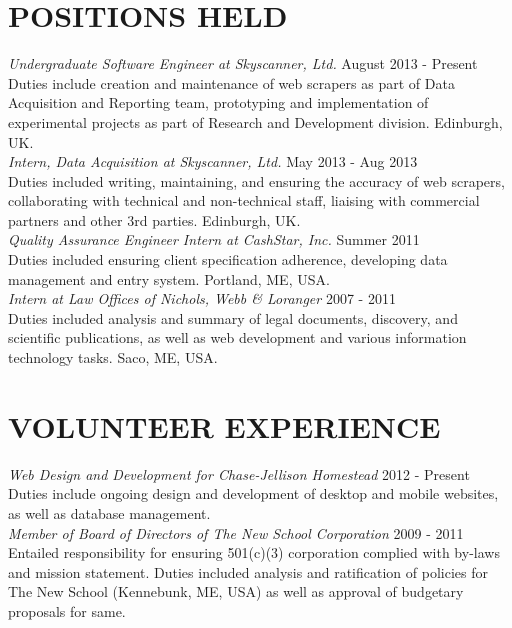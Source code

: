 \documentclass[line, margin]{res}
\begin{document}
\begin{resume}
\section{POSITIONS HELD}
\textit{Undergraduate Software Engineer at Skyscanner, Ltd.} \hfill August 2013 - Present \\
Duties include creation and maintenance of web scrapers as part of Data Acquisition and Reporting team, prototyping and implementation of experimental projects as part of Research and Development division. Edinburgh, UK.\\[5pt]
\textit{Intern, Data Acquisition at Skyscanner, Ltd.} \hfill May 2013 - Aug 2013 \\
Duties included writing, maintaining, and ensuring the accuracy of web scrapers, collaborating with technical and non-technical staff, liaising with commercial partners and other 3rd parties. Edinburgh, UK.\\[5pt]
\textit{Quality Assurance Engineer Intern at CashStar, Inc.} \hfill Summer 2011 \\
Duties included ensuring client specification adherence, developing data management and entry system. Portland, ME, USA.\\[5pt]
\textit{Intern at Law Offices of Nichols, Webb \& Loranger} \hfill 2007 - 2011 \\
Duties included analysis and summary of legal documents, discovery, and scientific publications, as well as web development and various information technology tasks. Saco, ME, USA.

\section{VOLUNTEER EXPERIENCE}
\textit{Web Design and Development for Chase-Jellison Homestead} \hfill 2012 - Present \\
Duties include ongoing design and development of desktop and mobile websites, as well as database management. \\[5pt]
\textit{Member of Board of Directors of The New School Corporation} \hfill 2009 - 2011 \\
Entailed responsibility for ensuring 501(c)(3) corporation complied with by-laws and mission statement. Duties included analysis and ratification of policies for The New School (Kennebunk, ME, USA) as well as approval of budgetary proposals for same. 


\end{resume}
\end{document}
